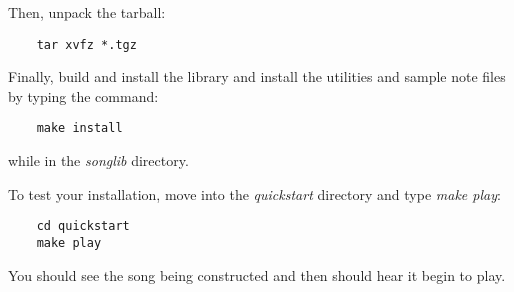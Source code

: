 \documentclass{article}
\begin{document}
Then, unpack the tarball:

\begin{verbatim}
    tar xvfz *.tgz
\end{verbatim}

Finally, build and install the library and install the utilities
and sample note files by typing the command:

\begin{verbatim}
    make install
\end{verbatim}

while in the {\it songlib} directory.

To test your installation, move into the {\it quickstart} directory and
type {\it make play}:

\begin{verbatim}
    cd quickstart
    make play
\end{verbatim}

You should see the song being constructed and then should hear it
begin to play.
\end{document}
